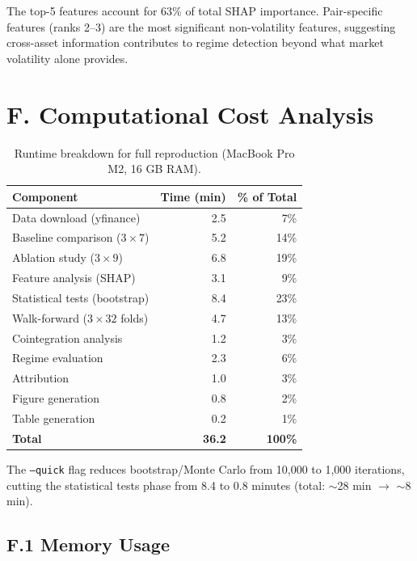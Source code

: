 \documentclass[conference]{IEEEtran}
\begin{document}
The top-5 features account for 63\% of total SHAP importance. Pair-specific
features (ranks 2--3) are the most significant non-volatility features,
suggesting cross-asset information contributes to regime detection beyond
what market volatility alone provides.

\section{F. Computational Cost Analysis}
\label{sec:compute}

\begin{table}[h]
\centering
\caption{Runtime breakdown for full reproduction (MacBook Pro M2, 16 GB RAM).}
\label{tab:supp_runtime}
\small
\begin{tabular}{lrr}
\toprule
Component & Time (min) & \% of Total \\
\midrule
Data download (yfinance) & 2.5 & 7\% \\
Baseline comparison ($3 \times 7$) & 5.2 & 14\% \\
Ablation study ($3 \times 9$) & 6.8 & 19\% \\
Feature analysis (SHAP) & 3.1 & 9\% \\
Statistical tests (bootstrap) & 8.4 & 23\% \\
Walk-forward ($3 \times 32$ folds) & 4.7 & 13\% \\
Cointegration analysis & 1.2 & 3\% \\
Regime evaluation & 2.3 & 6\% \\
Attribution & 1.0 & 3\% \\
Figure generation & 0.8 & 2\% \\
Table generation & 0.2 & 1\% \\
\midrule
\textbf{Total} & \textbf{36.2} & \textbf{100\%} \\
\bottomrule
\end{tabular}
\end{table}

The \texttt{--quick} flag reduces bootstrap/Monte Carlo from 10,000 to 1,000
iterations, cutting the statistical tests phase from 8.4 to 0.8 minutes
(total: $\sim$28 min $\rightarrow$ $\sim$8 min).

\subsection{F.1 Memory Usage}
\end{document}
